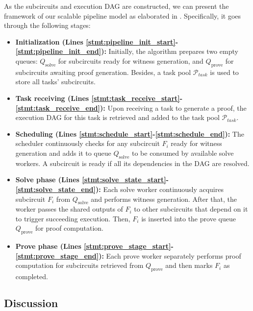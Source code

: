 As the subcircuits and execution DAG are constructed, we can present the framework of our scalable pipeline model as elaborated in . Specifically, it goes through the following stages:
\begin{itemize}[leftmargin=*]
    \item \textbf{Initialization (Lines \ref{stmt:pipeline_init_start}-\ref{stmt:pipeline_init_end}):}  
    Initially, the algorithm prepares two empty queues: $Q_{\text{solve}}$ for subcircuits ready for witness generation, and $Q_{\text{prove}}$ for subcircuits awaiting proof generation. Besides, a task pool $\mathcal{P}_{task}$ is used to store all tasks' subcircuits. 

    \item \textbf{Task receiving (Lines \ref{stmt:task_receive_start}-\ref{stmt:task_receive_end}):} Upon receiving a task to generate a proof, the execution DAG for this task is retrieved and added to the task pool $\mathcal{P}_{task}$.

    \item \textbf{Scheduling (Lines \ref{stmt:schedule_start}-\ref{stmt:schedule_end}):}  
    The scheduler continuously checks for any subcircuit $F_i$ ready for witness generation and adds it to queue $Q_{\text{solve}}$ to be consumed by available solve workers. A subcircuit is ready if all its dependencies in the DAG are resolved. 
    
    \item \textbf{Solve phase (Lines \ref{stmt:solve_state_start}-\ref{stmt:solve_state_end}):}  
    Each solve worker continuously acquires subcircuit $F_i$ from $Q_{\text{solve}}$ and performs witness generation. After that, the worker passes the shared outputs of $F_i$ to other subcircuits that depend on it to trigger succeeding execution. Then, $F_i$ is inserted into the prove queue $Q_{\text{prove}}$ for proof computation.

    \item \textbf{Prove phase (Lines \ref{stmt:prove_stage_start}-\ref{stmt:prove_stage_end}):}  
    Each prove worker separately performs proof computation for subcircuits retrieved from $Q_{\text{prove}}$ and then marks $F_i$ as completed.
\end{itemize}





\subsection{Discussion}


